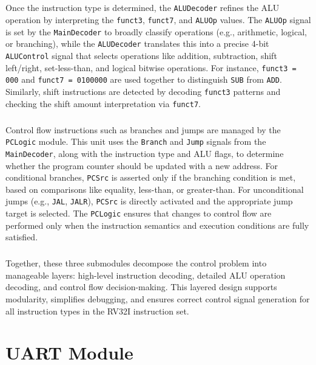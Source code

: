 \documentclass[12pt]{report}
\begin{document}
\paragraph{}
Once the instruction type is determined, the \texttt{ALUDecoder} refines the ALU operation by interpreting the \texttt{funct3}, \texttt{funct7}, and \texttt{ALUOp} values. The \texttt{ALUOp} signal is set by the \texttt{MainDecoder} to broadly classify operations (e.g., arithmetic, logical, or branching), while the \texttt{ALUDecoder} translates this into a precise 4-bit \texttt{ALUControl} signal that selects operations like addition, subtraction, shift left/right, set-less-than, and logical bitwise operations. For instance, \texttt{funct3 = 000} and \texttt{funct7 = 0100000} are used together to distinguish \texttt{SUB} from \texttt{ADD}. Similarly, shift instructions are detected by decoding \texttt{funct3} patterns and checking the shift amount interpretation via \texttt{funct7}.

\paragraph{}
Control flow instructions such as branches and jumps are managed by the \texttt{PCLogic} module. This unit uses the \texttt{Branch} and \texttt{Jump} signals from the \texttt{MainDecoder}, along with the instruction type and ALU flags, to determine whether the program counter should be updated with a new address. For conditional branches, \texttt{PCSrc} is asserted only if the branching condition is met, based on comparisons like equality, less-than, or greater-than. For unconditional jumps (e.g., \texttt{JAL}, \texttt{JALR}), \texttt{PCSrc} is directly activated and the appropriate jump target is selected. The \texttt{PCLogic} ensures that changes to control flow are performed only when the instruction semantics and execution conditions are fully satisfied.

\paragraph{}
Together, these three submodules decompose the control problem into manageable layers: high-level instruction decoding, detailed ALU operation decoding, and control flow decision-making. This layered design supports modularity, simplifies debugging, and ensures correct control signal generation for all instruction types in the RV32I instruction set.

\chapter{UART Module}
\end{document}
